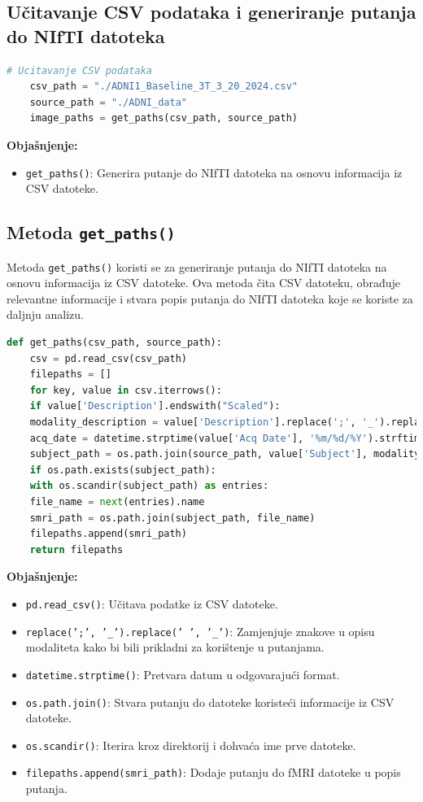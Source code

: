 \documentclass[zavrsnirad,upload]{fer}
\begin{document}
\subsection{Učitavanje CSV podataka i generiranje putanja do NIfTI datoteka}

\begin{lstlisting}[language=Python, caption={Učitavanje podataka i generiranje putanja}]
	# Ucitavanje CSV podataka
	csv_path = "./ADNI1_Baseline_3T_3_20_2024.csv"
	source_path = "./ADNI_data"
	image_paths = get_paths(csv_path, source_path)
\end{lstlisting}

\noindent \textbf{Objašnjenje:}
\begin{itemize}
	\item \texttt{get\_paths()}: Generira putanje do NIfTI datoteka na osnovu informacija iz CSV datoteke.
\end{itemize}

\subsection{Metoda \texttt{get\_paths()}}

Metoda \texttt{get\_paths()} koristi se za generiranje putanja do NIfTI datoteka na osnovu informacija iz CSV datoteke. Ova metoda čita CSV datoteku, obrađuje relevantne informacije i stvara popis putanja do NIfTI datoteka koje se koriste za daljnju analizu.

\begin{lstlisting}[language=Python, caption={Metoda get\_paths}]
	def get_paths(csv_path, source_path):
	csv = pd.read_csv(csv_path)
	filepaths = []
	for key, value in csv.iterrows():
	if value['Description'].endswith("Scaled"):
	modality_description = value['Description'].replace(';', '_').replace(' ', '_')
	acq_date = datetime.strptime(value['Acq Date'], '%m/%d/%Y').strftime('%Y-%m-%d')
	subject_path = os.path.join(source_path, value['Subject'], modality_description, acq_date, value['Image Data ID'])
	if os.path.exists(subject_path):
	with os.scandir(subject_path) as entries:
	file_name = next(entries).name
	smri_path = os.path.join(subject_path, file_name)
	filepaths.append(smri_path)
	return filepaths
\end{lstlisting}

\noindent \textbf{Objašnjenje:}
\begin{itemize}
	\item \texttt{pd.read\_csv()}: Učitava podatke iz CSV datoteke.
	\item \texttt{replace(';', '\_').replace(' ', '\_')}: Zamjenjuje znakove u opisu modaliteta kako bi bili prikladni za korištenje u putanjama.
	\item \texttt{datetime.strptime()}: Pretvara datum u odgovarajući format.
	\item \texttt{os.path.join()}: Stvara putanju do datoteke koristeći informacije iz CSV datoteke.
	\item \texttt{os.scandir()}: Iterira kroz direktorij i dohvaća ime prve datoteke.
	\item \texttt{filepaths.append(smri\_path)}: Dodaje putanju do fMRI datoteke u popis putanja.
\end{itemize}
\end{document}
